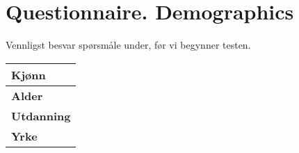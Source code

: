 \chapter{Questionnaire. Demographics}
\label{app:questionnaire}

Vennligst besvar spørsmåle under, f\o r vi begynner testen.
\begin{center}
	\begin{tabular}{ | p{10.0cm} |}
	\hline
	\textbf{Kj\o nn} \\[5ex] \hline
	\textbf{Alder} \\[5ex] \hline
	\textbf{Utdanning} \\[5ex] \hline
	\textbf{Yrke} \\[5ex] \hline
	\end{tabular}
\end{center}